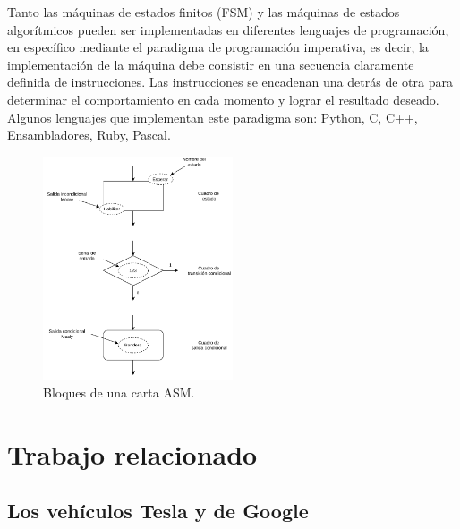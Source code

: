 Tanto las máquinas de estados finitos (FSM) y las máquinas de estados algorítmicos pueden ser implementadas en diferentes lenguajes de programación, en específico mediante el paradigma de programación imperativa, es decir, la implementación de la máquina debe consistir en una secuencia claramente definida de instrucciones. Las instrucciones se encadenan una detrás de otra para determinar el comportamiento en cada momento y lograr el resultado deseado. Algunos lenguajes que implementan este paradigma son: Python, C, C++, Ensambladores, Ruby, Pascal.
\begin{figure}[h]
    \centering
    \includegraphics[width=0.5\textwidth]{Figures/Figures_Cap02/asm_chart.pdf}
    \caption{Bloques de una carta ASM.}
    \label{fig:asm_blocks}
\end{figure}



\section{Trabajo relacionado} \label{sec:trabajo_relacionado}

\subsection{Los vehículos Tesla y de Google} \label{sub:los_vehículos_tesla_y_de_google}

